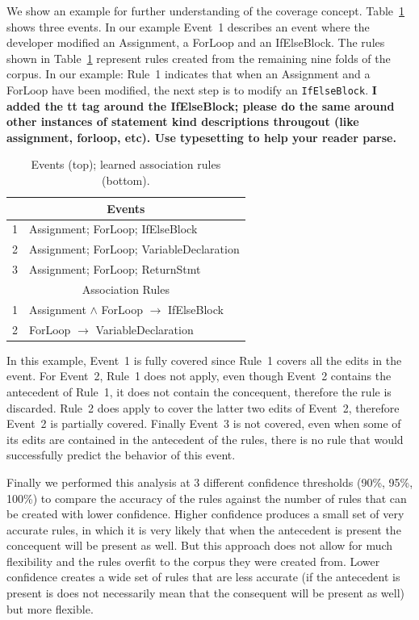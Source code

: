 \documentclass[sigconf]{acmart}
\newcommand{\todo}[1]
  {{\scriptsize \textbf{\color{red} {#1}}}}
\begin{document}
We show an example for further understanding of the coverage concept.
Table~\ref{rulesandinstances} shows three events. In 
our example Event~1 describes an event
where the developer modified an Assignment, a ForLoop and an IfElseBlock.
The rules shown in Table~\ref{rulesandinstances} represent rules created
from the remaining nine folds of the corpus. In our example: Rule~1 
indicates that when an Assignment and a ForLoop have been modified,
the next step is to modify an \texttt{IfElseBlock}.\todo{I added the tt tag
  around the IfElseBlock; please do the same around other instances of statement
  kind descriptions througout (like assignment, forloop, etc).  Use typesetting
  to help your reader parse.}


\begin{table}[ht]
  \centering
  \caption{Events (top); learned association rules (bottom). \label{rulesandinstances}}{\small
\begin{tabular}{ll}
\toprule
\multicolumn{2}{c}{Events} \\
\midrule
1 & Assignment; ForLoop; IfElseBlock  \\
2 & Assignment; ForLoop; VariableDeclaration\\  
3 & Assignment; ForLoop;  ReturnStmt \\
\midrule
 \multicolumn{2}{c}{Association Rules} \\                     
\midrule
1 & Assignment $\wedge$ ForLoop $\rightarrow$ IfElseBlock \\  
2 & ForLoop $\rightarrow$ VariableDeclaration \\   
\bottomrule
\end{tabular}
}
\end{table}

In this example, Event~1 is fully covered since Rule~1 covers all
the edits in the event. For Event~2, Rule~1 does not apply, even though
Event~2 contains the antecedent of Rule~1, it does not contain the 
concequent, therefore the rule is discarded. Rule~2 does apply to 
cover the latter two
edits of Event~2,
therefore Event~2 is partially covered. Finally Event~3 is not covered,
even when some of its edits are contained in the antecedent of the rules,
there is no rule that would successfully predict the behavior of this 
event. 

Finally we performed this analysis at 3 different confidence thresholds
(90\%, 95\%, 100\%) to compare the accuracy of the rules against the 
number of rules that can be created with lower confidence. 
Higher confidence produces a small set of very
accurate rules, in which it is very likely that when the antecedent
is present the concequent will be present as well. But this approach
does not allow for much flexibility and the rules overfit to the corpus 
they were created from. Lower 
confidence creates a wide set of rules that are less accurate (if
the antecedent is present is does not necessarily mean that the 
consequent will be present as well) but more flexible. 
\end{document}
